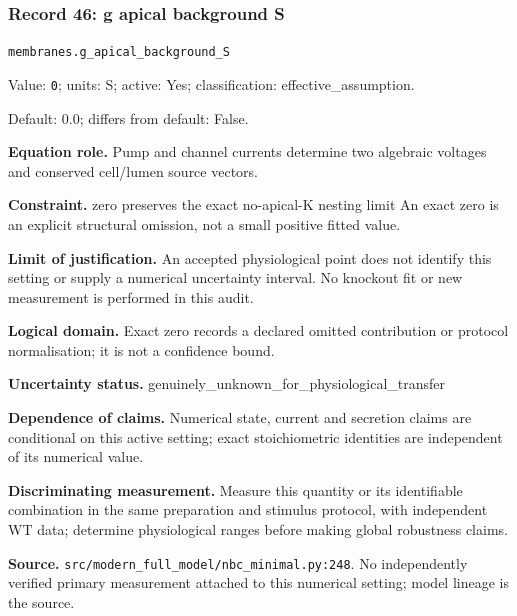 \subsubsection*{Record 46: g apical background S}
{\small \nolinkurl{membranes.g_apical_background_S}\par

Value: \texttt{0}; units: S; active: Yes; classification: effective\_assumption.\par

Default: 0.0; differs from default: False.\par

\textbf{Equation role.} Pump and channel currents determine two algebraic voltages and conserved cell/lumen source vectors.\par

\textbf{Constraint.} zero preserves the exact no-apical-K nesting limit An exact zero is an explicit structural omission, not a small positive fitted value.\par

\textbf{Limit of justification.} An accepted physiological point does not identify this setting or supply a numerical uncertainty interval. No knockout fit or new measurement is performed in this audit.\par

\textbf{Logical domain.} Exact zero records a declared omitted contribution or protocol normalisation; it is not a confidence bound.\par

\textbf{Uncertainty status.} genuinely\_unknown\_for\_physiological\_transfer\par

\textbf{Dependence of claims.} Numerical state, current and secretion claims are conditional on this active setting; exact stoichiometric identities are independent of its numerical value.\par

\textbf{Discriminating measurement.} Measure this quantity or its identifiable combination in the same preparation and stimulus protocol, with independent WT data; determine physiological ranges before making global robustness claims.\par

\textbf{Source.} \nolinkurl{src/modern_full_model/nbc_minimal.py:248}. No independently verified primary measurement attached to this numerical setting; model lineage is the source.\par}


